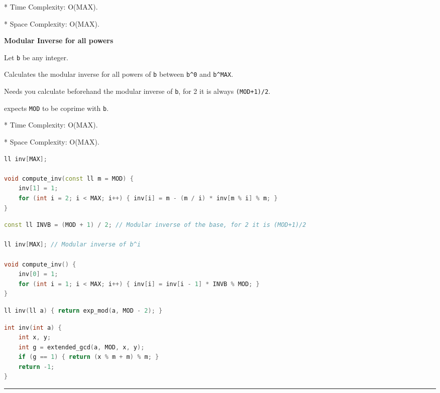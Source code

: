 \documentclass[11pt, a4paper, twoside]{book}
\begin{document}
* Time Complexity: O(MAX).

* Space Complexity: O(MAX).



\textbf{Modular Inverse for all powers} 



Let \lstinline{b} be any integer.



Calculates the modular inverse for all powers of \lstinline{b} between \lstinline{b^0} and \lstinline{b^MAX}.



Needs you calculate beforehand the modular inverse of \lstinline{b}, for 2 it is always \lstinline{(MOD+1)/2}.



expects \lstinline{MOD} to be coprime with \lstinline{b}.



* Time Complexity: O(MAX).

* Space Complexity: O(MAX).


\hfill

\begin{lstlisting}[language=C++]
ll inv[MAX];

void compute_inv(const ll m = MOD) {
    inv[1] = 1;
    for (int i = 2; i < MAX; i++) { inv[i] = m - (m / i) * inv[m % i] % m; }
}
\end{lstlisting}

\hfill

\begin{lstlisting}[language=C++]
const ll INVB = (MOD + 1) / 2; // Modular inverse of the base, for 2 it is (MOD+1)/2

ll inv[MAX]; // Modular inverse of b^i

void compute_inv() {
    inv[0] = 1;
    for (int i = 1; i < MAX; i++) { inv[i] = inv[i - 1] * INVB % MOD; }
}
\end{lstlisting}

\hfill

\begin{multicols}{2}
\begin{lstlisting}[language=C++]
ll inv(ll a) { return exp_mod(a, MOD - 2); }
\end{lstlisting}
\end{multicols}

\hfill

\begin{multicols}{2}
\begin{lstlisting}[language=C++]
int inv(int a) {
    int x, y;
    int g = extended_gcd(a, MOD, x, y);
    if (g == 1) { return (x % m + m) % m; }
    return -1;
}
\end{lstlisting}
\end{multicols}

\hfill

\rule{\textwidth}{0.4pt}
\end{document}

